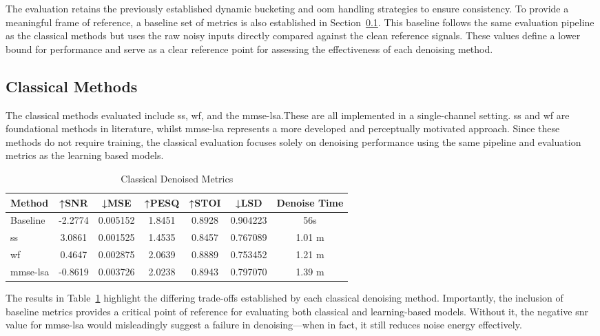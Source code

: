 The evaluation retains the previously established dynamic bucketing and \gls{oom} handling strategies to ensure consistency. To provide a meaningful frame of reference, a baseline set of metrics is also established in Section~\ref{sec:classical_methods}. This baseline follows the same evaluation pipeline as the classical methods but uses the raw noisy inputs directly compared against the clean reference signals. These values define a lower bound for performance and serve as a clear reference point for assessing the effectiveness of each denoising method.

\subsection{Classical Methods}
\label{sec:classical_methods}

The classical methods evaluated include \gls{ss}, \gls{wf}, and the \gls{mmse-lsa}.These are all implemented in a single-channel setting. \gls{ss} and \gls{wf} are foundational methods in literature, whilst \gls{mmse-lsa} represents a more developed and perceptually motivated approach. Since these methods do not require training, the classical evaluation focuses solely on denoising performance using the same pipeline and evaluation metrics as the learning based models.

\vspace{1em}
\begin{table}[H]
\centering
\caption{Classical Denoised Metrics}
\label{tab:classical_metrics}
\begin{tabular}{|l|c|c|c|c|c|c|}
\hline
\textbf{Method} & \textbf{↑SNR} & \textbf{↓MSE} & \textbf{↑PESQ} & \textbf{↑STOI} & \textbf{↓LSD} & \textbf{Denoise Time} \\
\hline
Baseline     & -2.2774 & 0.005152 & 1.8451 & 0.8928 & 0.904223 & 56s \\
\gls{ss}          & 3.0861 & 0.001525 & 1.4535 & 0.8457 & 0.767089 & 1.01 m \\
\gls{wf}          & 0.4647 & 0.002875 & 2.0639 & 0.8889 & 0.753452 & 1.21 m \\
\gls{mmse-lsa}    & -0.8619 & 0.003726 & 2.0238 & 0.8943 & 0.797070 & 1.39 m \\
\hline
\end{tabular}
\end{table}

The results in Table~\ref{tab:classical_metrics} highlight the differing trade-offs established by each classical denoising method. Importantly, the inclusion of baseline metrics provides a critical point of reference for evaluating both classical and learning-based models. Without it, the negative \gls{snr} value for \gls{mmse-lsa} would misleadingly suggest a failure in denoising—when in fact, it still reduces noise energy effectively.

